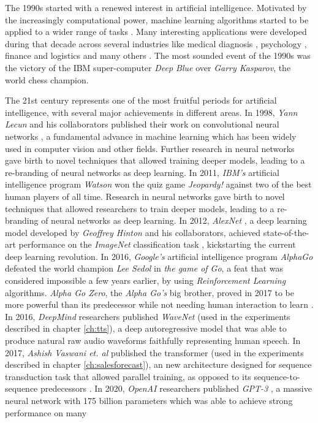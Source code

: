 The 1990s started with a renewed interest in artificial intelligence. Motivated by the increasingly computational power, machine learning algorithms started to be applied to a wider range of tasks \autocite{Tesauro:1995}. Many interesting applications were developed during that decade across several industries like medical diagnosis \autocite{declaris1991, Klein1991, punch1992, Cinar1999}, psychology \autocite{Dorrer1995, denby1999, Ogawa1999, Perlovsky1999}, finance and logistics \autocite{Lipshutz1991, Benaroch1991, Johnson1991, Falas1994} and many others \autocite{Smithers1993, Yoo1994, Mashaly1994, Koyma1998}. The most sounded event of the 1990s was the victory of the IBM super-computer \textit{Deep Blue} \autocite{Campbell2002} over \textit{Garry Kasparov}, the world chess champion.

The 21st century represents one of the most fruitful periods for artificial intelligence, with several major achievements in different areas. In 1998, \textit{Yann Lecun} and his collaborators published their work on convolutional neural networks \autocite{lecun1999}, a fundamental advance in machine learning which has been widely used in computer vision and other fields. Further research in neural networks \autocite{hinton2006, hinton2012} gave birth to novel techniques that allowed training deeper models, leading to a re-branding of neural networks as deep learning. In 2011, \textit{IBM's} artificial intelligence program \textit{Watson} won the quiz game \textit{Jeopardy!} against two of the best human players of all time. Research in neural networks gave birth to novel techniques that allowed researchers to train deeper models, leading to a re-branding of neural networks as deep learning. In 2012, \textit{AlexNet} \autocite{krizhevsky2012}, a deep learning model developed by \textit{Geoffrey Hinton} and his collaborators, achieved state-of-the-art performance on the \textit{ImageNet} classification task \autocite{ILSVRC15}, kickstarting the current deep learning revolution. In 2016, \textit{Google's} artificial intelligence program \textit{AlphaGo} \autocite{silver2016} defeated the world champion \textit{Lee Sedol} in \textit{the game of Go}, a feat that was considered impossible a few years earlier, by using \textit{Reinforcement Learning} algorithms. \textit{Alpha Go Zero}, the \textit{Alpha Go's} big brother, proved in 2017 to be more powerful than its predecessor while not needing human interaction to learn \autocite{Silver2017a, Silver2017b}. In 2016, \textit{DeepMind} researchers published \textit{WaveNet} \autocite{vanderoord2016} (used in the experiments described in chapter \ref{ch:tts}), a deep autoregressive model that was able to produce natural raw audio waveforms faithfully representing human speech. In 2017, \textit{Ashish Vaswani et. al} published the transformer \autocite{vaswani2017} (used in the experiments described in chapter \ref{ch:salesforecast}), an new architecture designed for sequence transduction task that allowed parallel training, as opposed to its sequence-to-sequence predecessors \autocite{sutskever2014}. In 2020, \textit{OpenAI} researchers published \textit{GPT-3} \autocite{brown2020}, a massive neural network with 175 billion parameters which was able to achieve strong performance on many 